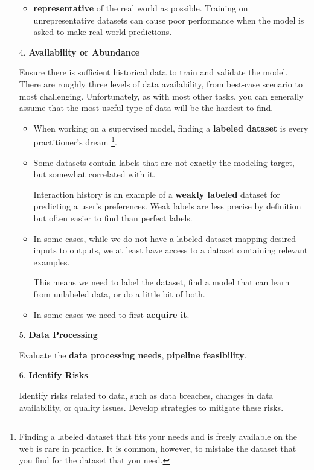\begin{enumerate}
\begin{itemize}
        \item \textbf{representative} of the real world as possible.
        Training on unrepresentative datasets can cause poor performance
        when the model is asked to make real-world predictions.
    \end{itemize}


    \item [4.] \textbf{Availability or Abundance}
    
    \noindent

    Ensure there is sufficient historical data to train and
    validate the model. There are roughly three levels of data
    availability, from best-case scenario to most challenging.
    Unfortunately, as with most other tasks, you can generally
    assume that the most useful type of data will be the hardest to
    find.

    \begin{itemize}
        \item When working on a supervised model, finding a
        \textbf{labeled dataset} is every practitioner's dream
        \footnote{
            Finding a labeled dataset that fits your needs and is
            freely available on the web is rare in practice. It is
            common, however, to mistake the dataset that you find
            for the dataset that you need.
        }.

        \item Some datasets contain labels that are not exactly the
        modeling target, but somewhat correlated with it.
        
        Interaction history is an example of a \textbf{weakly
        labeled} dataset for predicting a user's preferences. Weak
        labels are less precise by definition but often easier to
        find than perfect labels.

        \item In some cases, while we do not have a labeled dataset
        mapping desired inputs to outputs, we at least have access
        to a dataset containing relevant examples.
        
        This means we need to label the dataset, find a model
        that can learn from unlabeled data, or do a little bit of
        both.

        \item In some cases we need to first \textbf{acquire it}.
    \end{itemize}

    \item[5.] \textbf{Data Processing} 
    
    \noindent
    Evaluate the \textbf{data processing needs},
    \textbf{pipeline feasibility}.

    \item[6.] \textbf{Identify Risks}
    
    \noindent
    Identify risks related to data, such as data breaches, changes
    in data availability, or quality issues. Develop strategies to
    mitigate these risks.

\end{enumerate}
